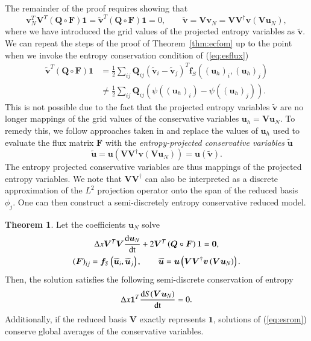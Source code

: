 \documentclass[preprint,10pt]{elsarticle}
\theoremstyle{definition}
\theoremstyle{lemma}
\theoremstyle{theorem}
\newtheorem{theorem}{Theorem}
\theoremstyle{assumption}
\renewcommand{\tilde}{\widetilde}
\newcommand{\td}[2]{\frac{{\rm d}#1}{{\rm d}{\rm #2}}}
\newcommand{\LRp}[1]{\left( #1 \right)}
\begin{document}
The remainder of the proof requires showing that 
\[
\bm{v}_N^T\bm{V}^T\LRp{\bm{Q}\circ \bm{F}}\bm{1} = \tilde{\bm{v}}^T\LRp{\bm{Q}\circ \bm{F}}\bm{1}  = 0, \qquad \tilde{\bm{v}} = \bm{V}\bm{v}_N = \bm{V}\bm{V}^{\dagger} \bm{v}\LRp{\bm{V}\bm{u}_N},
\]
where we have introduced the grid values of the projected entropy variables as $\tilde{\bm{v}}$.
We can repeat the steps of the proof of Theorem~\ref{thm:ecfom} up to the point when we invoke the entropy conservation condition of (\ref{eq:esflux})
\begin{align*}
\tilde{\bm{v}}^T\LRp{{\bm{Q}}\circ \bm{F}}\bm{1} &= \frac{1}{2}\sum_{ij} \bm{Q}_{ij} \LRp{\tilde{\bm{v}}_i-\tilde{\bm{v}}_j}^T \bm{f}_{S}\LRp{\LRp{\bm{u}_h}_i, \LRp{\bm{u}_h}_j}\\
&\neq \frac{1}{2}\sum_{ij} \bm{Q}_{ij} \LRp{ \psi((\bm{u}_h)_i)- \psi((\bm{u}_h)_j)}.
\end{align*}
This is not possible due to the fact that the projected entropy variables $\tilde{\bm{v}}$ are no longer mappings of the grid values of the conservative variables $\bm{u}_h = \bm{V}\bm{u}_N$.  To remedy this, we follow approaches taken in \cite{parsani2016entropy, chan2017discretely} and replace the values of ${\bm{u}_h}$ used to evaluate the flux matrix $\bm{F}$ with the \textit{entropy-projected conservative variables} $\tilde{\bm{u}}$
\[
\tilde{\bm{u}} = \bm{u}\LRp{\bm{V}\bm{V}^{\dagger}\bm{v}\LRp{\bm{V}\bm{u}_N}} = \bm{u}\LRp{\tilde{\bm{v}}}.
\]
The entropy projected conservative variables are thus mappings of the projected entropy variables.  We note that $\bm{V}\bm{V}^{\dagger}$ can also be interpreted as a discrete approximation of the $L^2$ projection operator onto the span of the reduced basis $\phi_j$. One can then construct a semi-discretely entropy conservative reduced model.
\begin{theorem} 
Let the coefficients $\bm{u}_N$ solve
\begin{gather}
\Delta x\bm{V}^T\bm{V}\td{\bm{u}_N}{t} + 2\bm{V}^T\LRp{\bm{Q}\circ \bm{F}}\bm{1} = \bm{0}, \label{eq:esrom}\\
\LRp{\bm{F}}_{ij} = \bm{f}_S\LRp{\tilde{\bm{u}}_i,\tilde{\bm{u}}_j}, \qquad \tilde{\bm{u}} = \bm{u}\LRp{\bm{V}\bm{V}^{\dagger}\bm{v}\LRp{\bm{V}\bm{u}_N}}.\nonumber
\end{gather}
Then, the solution satisfies the following semi-discrete conservation of entropy
\[
\Delta x\bm{1}^T\td{S(\bm{V}\bm{u}_N)}{t} = 0.
\]
Additionally, if the reduced basis $\bm{V}$ exactly represents $\bm{1}$, solutions of (\ref{eq:esrom}) conserve global averages of the conservative variables.
\label{thm:esrom}
\end{theorem}
\end{document}
